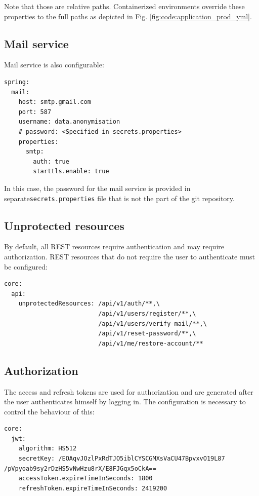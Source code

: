 \documentclass[a4paper,twoside,12pt]{book}
\begin{document}
Note that those are relative paths. Containerized environments override these properties to the full paths as depicted in Fig. \ref{fig:code:application_prod_yml}.



\subsection{Mail service}

Mail service is also configurable:
\begin{verbatim}
spring:
  mail:
    host: smtp.gmail.com
    port: 587
    username: data.anonymisation
    # password: <Specified in secrets.properties>
    properties:
      smtp:
        auth: true
        starttls.enable: true
\end{verbatim}
In this case, the password for the mail service is provided in separate\newline \verb|secrets.properties| file that is not the part of the git repository.

\subsection{Unprotected resources}

By default, all REST resources require authentication and may require authorization. REST resources that do not require the user to authenticate must be configured:
\begin{verbatim}
core:
  api:
    unprotectedResources: /api/v1/auth/**,\
                          /api/v1/users/register/**,\
                          /api/v1/users/verify-mail/**,\
                          /api/v1/reset-password/**,\
                          /api/v1/me/restore-account/**
\end{verbatim}

\subsection{Authorization}

The access and refresh tokens are used for authorization and are generated after the user authenticates himself by logging in. The configuration is necessary to control the behaviour of this:
\begin{verbatim}
core:
  jwt:
    algorithm: HS512
    secretKey: /EOAqvJOzlPxRdTJO5iblCYSCGMXsVaCU47BpvxvO19L87 /pVpyoab9sy2rDzHS5vNwHzu8rX/E8FJGqx5oCkA==
    accessToken.expireTimeInSeconds: 1800
    refreshToken.expireTimeInSeconds: 2419200
\end{verbatim}
\end{document}
